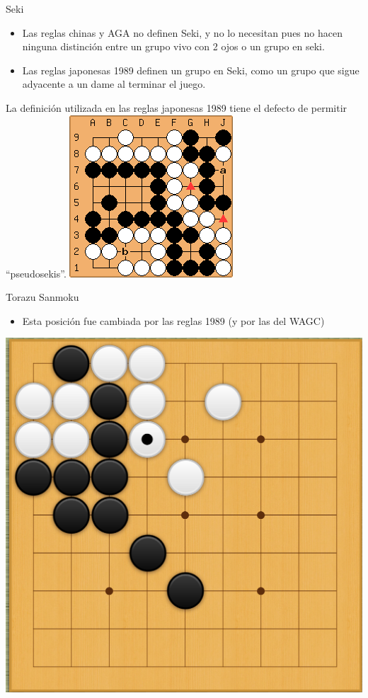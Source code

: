 \documentclass{beamer}
\begin{document}
\begin{frame}{Seki}
    \begin{itemize}
        \item Las reglas chinas y AGA no definen Seki, y no lo necesitan pues no hacen ninguna distinción entre un grupo vivo con 2 ojos o un grupo en seki.
        \item Las reglas japonesas 1989 definen un grupo en Seki, como un grupo que sigue adyacente a un dame al terminar el juego.
    \end{itemize}
    La definición utilizada en las reglas japonesas 1989 tiene el defecto de permitir ``pseudosekis''.
    \includegraphics[scale=0.4]{pseudoseki.png}
\end{frame}

\begin{frame}{Torazu Sanmoku}
    \begin{itemize}
        \item Esta posición fue cambiada por las reglas 1989 (y por las del WAGC)
    \end{itemize}
    
    \includegraphics[scale=0.2]{torazu-sanmoku.png}
\end{frame}
\end{document}
